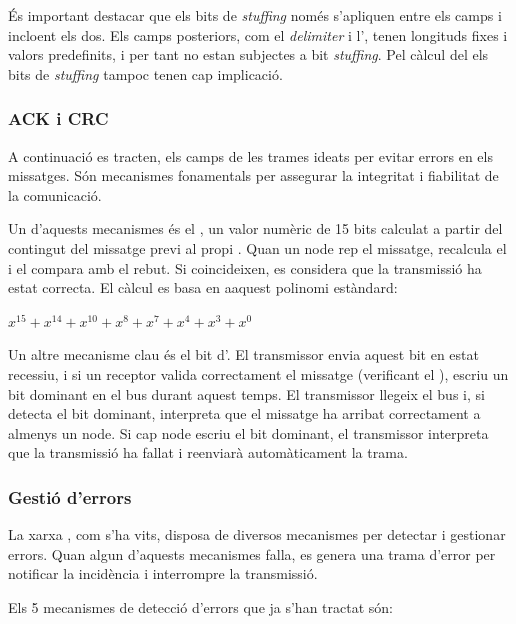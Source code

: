 \documentclass{tfgitic}[2024/07/01]
\begin{document}
És important destacar que els bits de \textit{stuffing} només s'apliquen entre els camps  i  incloent els dos. Els camps posteriors, com el 
 \textit{delimiter} i l', tenen longituds fixes i valors predefinits, i per tant no estan subjectes a bit \textit{stuffing}. Pel càlcul del  els bits 
de \textit{stuffing} tampoc tenen cap implicació.

\subsubsection{ACK i CRC}

A continuació es tracten, els camps de les trames  ideats per evitar errors en els missatges. Són mecanismes fonamentals per assegurar la integritat i fiabilitat 
de la comunicació.

Un d'aquests mecanismes és el , un valor numèric de 15 bits calculat a partir del contingut del missatge previ al propi .  
Quan un node rep el missatge, recalcula el  i el compara amb el rebut. Si coincideixen, es considera que la transmissió ha estat correcta. 
El càlcul es basa en aaquest polinomi estàndard:

\( x^{15} + x^{14} + x^{10} + x^{8} + x^{7} + x^{4} + x^{3} + x^{0} \)

Un altre mecanisme clau és el bit d'. El transmissor envia aquest bit en estat recessiu, i si un receptor valida correctament el missatge 
(verificant el ), escriu un bit dominant en el bus durant aquest temps. El transmissor llegeix el bus i, si detecta el bit dominant, interpreta 
que el missatge ha arribat correctament a almenys un node. Si cap node escriu el bit dominant, el transmissor interpreta que la transmissió ha fallat 
i reenviarà automàticament la trama.

\subsubsection{Gestió d'errors}

La xarxa , com s'ha vits, disposa de diversos mecanismes per detectar i gestionar errors. Quan algun d'aquests mecanismes falla, es genera una trama d'error per 
notificar la incidència i interrompre la transmissió.

Els 5 mecanismes de detecció d'errors que ja s'han tractat són:
\end{document}

